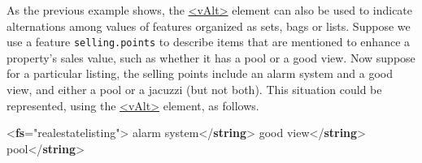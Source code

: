 As the previous example shows, the \hyperref[TEI.vAlt]{<vAlt>} element can also be used to indicate alternations among values of features organized as sets, bags or lists. Suppose we use a feature \texttt{selling.points} to describe items that are mentioned to enhance a property's sales value, such as whether it has a pool or a good view. Now suppose for a particular listing, the selling points include an alarm system and a good view, and either a pool or a jacuzzi (but not both). This situation could be represented, using the \hyperref[TEI.vAlt]{<vAlt>} element, as follows. \par\bgroup{}\exampleFont \begin{shaded}\noindent\mbox{}{<\textbf{fs}\hspace*{1em}{type}="{real\textunderscore estate\textunderscore listing}">}\mbox{}\newline 
{}\mbox{}\newline 
\hspace*{1em}\mbox{}\newline 
\hspace*{1em}\hspace*{1em}alarm system{</\textbf{string}>}\mbox{}\newline 
\hspace*{1em}\hspace*{1em}good view{</\textbf{string}>}\mbox{}\newline 
\hspace*{1em}\hspace*{1em}\mbox{}\newline 
\hspace*{1em}\hspace*{1em}\hspace*{1em}pool{</\textbf{string}>}\mbox{}\newline 

\end{shaded}
